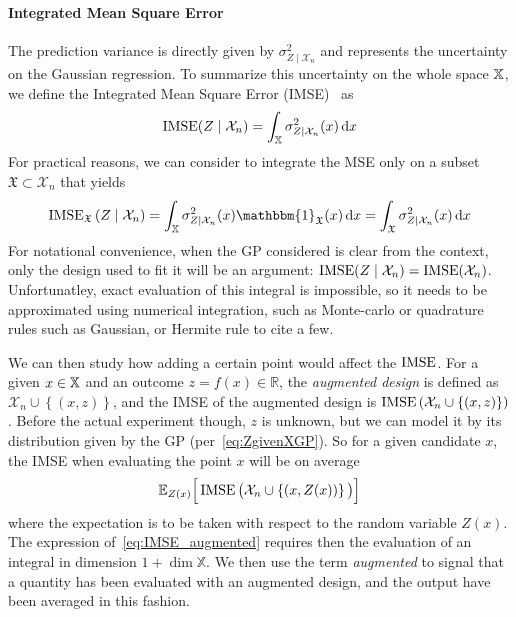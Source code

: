 \documentclass[../../Main_ManuscritThese.tex]{subfiles}
\begin{document}
\paragraph{Integrated Mean Square Error}
The prediction variance is directly given by
$\sigma^2_{Z\mid \mathcal{X}_n}$ and represents the uncertainty on the
Gaussian regression. To summarize this uncertainty on the whole space
$\mathbb{X}$, we define the Integrated Mean Square Error
(IMSE)~\citep{sacks_designs_1989} as
\begin{equation}
  \operatorname{\mathrm{IMSE}}(Z \mid \mathcal{X}_n) = \int_{\mathbb{X}} \sigma_{Z\mid\mathcal{X}_n}^2(x)\,\mathrm{d}x
\end{equation}
For practical reasons, we can consider to integrate the MSE only on a
subset $\mathfrak{X}\subset \mathcal{X}_n$ that yields
\begin{equation}
  \IMSE_{\mathfrak{X}}\left(Z \mid \mathcal{X}_n \right) = \int_{\Xspace} \sigma^2_{Z\mid \mathcal{X}_n}(x)  \mathbbm{1}_{\mathfrak{X}}(x)\,\mathrm{d}x = \int_{\mathfrak{X}} \sigma^2_{Z\mid \mathcal{X}_n}(x)\,\mathrm{d}x
\end{equation}
For notational convenience, when the GP considered is clear from the
context, only the design used to fit it will be an argument:
$\operatorname{\mathrm{IMSE}}(Z \mid \mathcal{X}_n) = \operatorname{\mathrm{IMSE}}(\mathcal{X}_n)$.  Unfortunatley, 
exact evaluation of this integral is impossible, so it needs to be
approximated using numerical integration, such as Monte-carlo or
quadrature rules such as Gaussian, or Hermite rule to cite a
few.%

We can then study how adding a certain point would affect the
$\operatorname{\mathrm{IMSE}}$. For a given $x\in \mathbb{X}$ and an outcome
$z=f(x)\in \mathbb{R}$, the \emph{augmented design} is defined as
$\mathcal{X}_n \cup \left\{(x, z)\right\}$, and the IMSE of the
augmented design is
$\operatorname{\mathrm{IMSE}}\left(\mathcal{X}_n \cup \left\{(x, z)\right\} \right)$.  Before
the actual experiment though, $z$ is unknown, but we can model it by
its distribution given by the GP (per~\cref{eq:ZgivenXGP}). So for a
given candidate $x$, the IMSE when evaluating the point $x$ will be on
average
\begin{equation}
  \label{eq:IMSE_augmented}
  \mathbb{E}_{Z(x)}\Big[\operatorname{\mathrm{IMSE}}\big(\mathcal{X}_n \cup \left\{(x, Z(x))\right\} \big)\Big]
\end{equation}
where the expectation is to be taken with respect to the random
variable $Z(x)$. The expression of~\cref{eq:IMSE_augmented} requires
then the evaluation of an integral in dimension $1+\dim \mathbb{X}$.
We then use the term \emph{augmented} to signal that a quantity has
been evaluated with an augmented design, and the output have been
averaged in this fashion.
\end{document}
